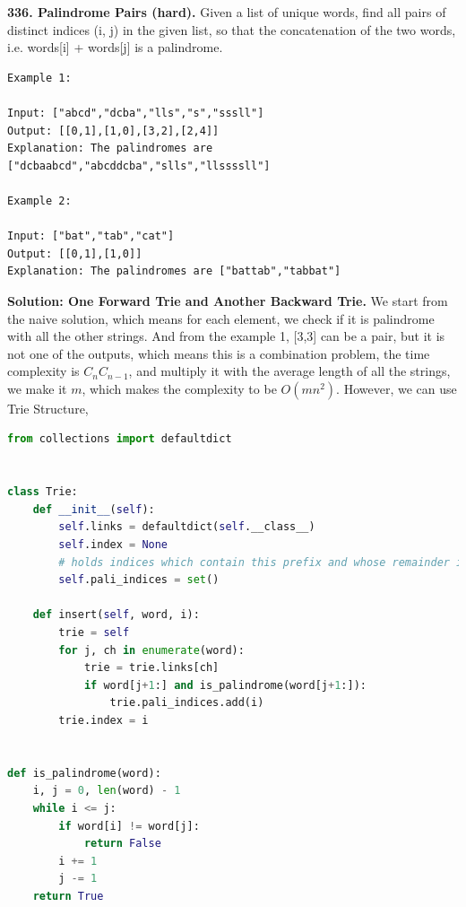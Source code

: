 \documentclass[../main.tex]{subfiles}
\begin{document}
\begin{examples}
\item \textbf{336. Palindrome Pairs (hard).} Given a list of unique words, find all pairs of distinct indices (i, j) in the given list, so that the concatenation of the two words, i.e. words[i] + words[j] is a palindrome.
\begin{lstlisting}
Example 1:

Input: ["abcd","dcba","lls","s","sssll"]
Output: [[0,1],[1,0],[3,2],[2,4]] 
Explanation: The palindromes are ["dcbaabcd","abcddcba","slls","llssssll"]

Example 2:

Input: ["bat","tab","cat"]
Output: [[0,1],[1,0]] 
Explanation: The palindromes are ["battab","tabbat"]
\end{lstlisting}
\textbf{Solution: One Forward Trie and Another Backward Trie.}  We start from the naive solution, which means for each element, we check if it is palindrome with all the other strings. And from the example 1, [3,3] can be a pair, but it is not one of the outputs, which means this is a combination problem, the time complexity is ${C_n}{C_{n-1}}$, and multiply it with the average length of all the strings, we make it $m$, which makes the complexity to be $O(mn^2)$. However, we can use Trie Structure, 
\begin{lstlisting}[language = Python]
from collections import defaultdict


class Trie:
    def __init__(self):
        self.links = defaultdict(self.__class__)
        self.index = None
        # holds indices which contain this prefix and whose remainder is a palindrome
        self.pali_indices = set()

    def insert(self, word, i):
        trie = self
        for j, ch in enumerate(word):
            trie = trie.links[ch]
            if word[j+1:] and is_palindrome(word[j+1:]):
                trie.pali_indices.add(i)
        trie.index = i


def is_palindrome(word):
    i, j = 0, len(word) - 1
    while i <= j:
        if word[i] != word[j]:
            return False
        i += 1
        j -= 1
    return True



\end{lstlisting}
\end{examples}
\end{document}
